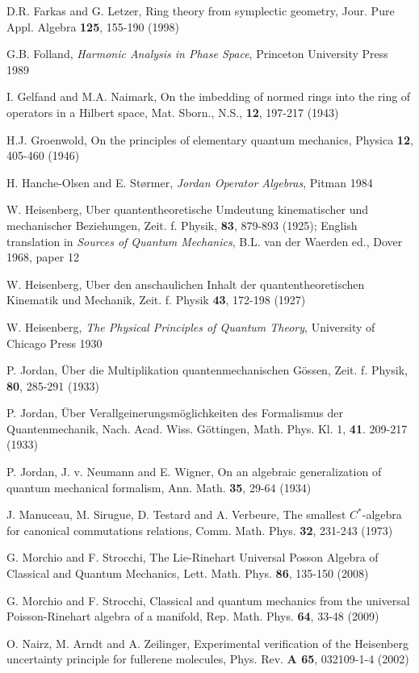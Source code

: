 \documentclass[12pt]{article}
\begin{document}
D.R. Farkas and G. Letzer, Ring theory from symplectic geometry, Jour. Pure Appl. Algebra {\bf 125}, 155-190 (1998)

G.B. Folland, {\em Harmonic Analysis in Phase Space}, Princeton University Press 1989

I. Gelfand and M.A. Naimark, On the imbedding of normed rings into the ring of operators in a Hilbert space, Mat. Sborn., N.S., {\bf 12}, 197-217 (1943)

H.J. Groenwold, On the principles of elementary quantum mechanics, Physica {\bf 12}, 405-460 (1946)

H. Hanche-Olsen and E. St{\o}rmer, {\em Jordan Operator Algebras}, Pitman 1984

W. Heisenberg, Uber quantentheoretische Umdeutung kinematischer und mechanischer Beziehungen, Zeit. f. Physik,  {\bf 83}, 879-893 (1925); English translation in {\em Sources of Quantum Mechanics}, B.L. van der Waerden ed., Dover 1968, paper 12

W. Heisenberg, Uber den anschaulichen Inhalt der quantentheoretischen Kinematik und Mechanik, Zeit. f. Physik {\bf 43}, 172-198 (1927)

W. Heisenberg, {\em The Physical Principles of Quantum Theory}, University of Chicago Press 1930

P. Jordan,   \"{U}ber die Multiplikation quantenmechanischen G\"{o}ssen, Zeit. f. Physik, {\bf 80}, 285-291 (1933)

P. Jordan, \"{U}ber Verallgeinerungsm\"{o}glichkeiten des Formalismus der Quantenmechanik, Nach. Acad. Wiss. G\"{o}ttingen, Math. Phys. Kl. 1, {\bf 41}. 209-217 (1933)

P. Jordan, J. v. Neumann and E. Wigner, On an algebraic generalization of quantum mechanical formalism, Ann. Math. {\bf 35}, 29-64 (1934)

J. Manuceau, M. Sirugue, D. Testard and A. Verbeure, The smallest $C^*$-algebra for canonical commutations relations, Comm. Math. Phys. {\bf 32}, 231-243 (1973)

G. Morchio and F. Strocchi, The Lie-Rinehart Universal Posson Algebra of Classical and Quantum Mechanics, Lett. Math. Phys. {\bf 86}, 135-150 (2008)

G. Morchio and F. Strocchi, Classical and quantum mechanics from the universal Poisson-Rinehart algebra of a manifold, Rep. Math. Phys. {\bf 64}, 33-48 (2009)

O. Nairz, M. Arndt and A. Zeilinger,  Experimental verification of the Heisenberg uncertainty principle for fullerene molecules,   Phys. Rev. {\bf A 65},  032109-1-4   (2002)
\end{document}
